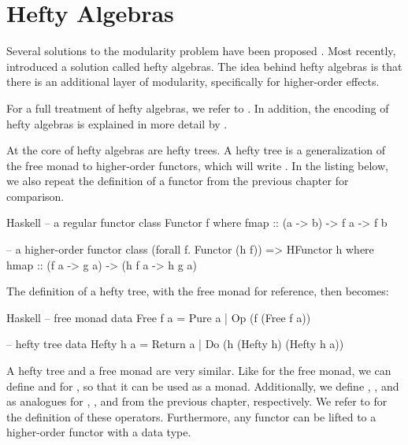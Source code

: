 \section{Hefty Algebras}\label{sec:hefty_algebras}

Several solutions to the modularity problem have been proposed \autocite{wu_effect_2014,oh_latent_2021}. Most recently, \textcite{bach_poulsen_hefty_2023} introduced a solution called hefty algebras. The idea behind hefty algebras is that there is an additional layer of modularity, specifically for higher-order effects.

For a full treatment of hefty algebras, we refer to \textcite{bach_poulsen_hefty_2023}. In addition, the encoding of hefty algebras is explained in more detail by \textcite{bach_poulsen_algebras_2023}.

At the core of hefty algebras are hefty trees. A hefty tree is a generalization of the free monad to higher-order functors, which will write . In the listing below, we also repeat the definition of a functor from the previous chapter for comparison.

\begin{lst}{Haskell}
-- a regular functor
class Functor f where
  fmap :: (a -> b) -> f a -> f b

-- a higher-order functor
class (forall f. Functor (h f)) => HFunctor h where
  hmap :: (f a -> g a) -> (h f a -> h g a)
\end{lst}
%
The definition of a hefty tree, with the free monad for reference, then becomes:

\begin{lst}{Haskell}
-- free monad
data Free f a
  = Pure a
  | Op (f (Free f a))

-- hefty tree
data Hefty h a
  = Return a
  | Do (h (Hefty h) (Hefty h a))
\end{lst}
%
A hefty tree and a free monad are very similar. Like for the free monad, we can define  and \hs{>>=} for , so that it can be used as a monad. Additionally, we define , \hs{:<:}, and \hs{:+:} as analogues for , \hs{<}, and \hs{+} from the previous chapter, respectively. We refer to \textcite{bach_poulsen_algebras_2023} for the definition of these operators. Furthermore, any functor can be lifted to a higher-order functor with a  data type.

